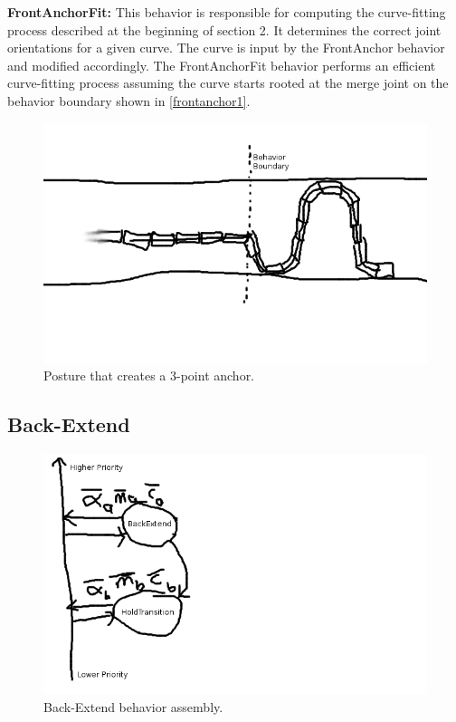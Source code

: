 \textbf{FrontAnchorFit:}
This behavior is responsible for computing the curve-fitting process described at the beginning of section 2. It determines the correct joint orientations for a given curve. The curve is input by the FrontAnchor behavior and modified accordingly. The FrontAnchorFit behavior performs an efficient curve-fitting process assuming the curve starts rooted at the merge joint on the behavior boundary shown in \autoref{frontanchor1}.

\begin{figure}[htbp]
\centering
\includegraphics[keepaspectratio,width=400pt,height=0.75\textheight]{2_frontanchor_1.png}
\caption{Posture that creates a 3-point anchor.}
\label{frontanchor1}
\end{figure}



\subsection{Back-Extend}
\label{back-extend}

\begin{figure}[htbp]
\centering
\includegraphics[keepaspectratio,width=400pt,height=0.75\textheight]{2_adaptive_3.png}
\caption{Back-Extend behavior assembly.}
\label{adaptive3}
\end{figure}



